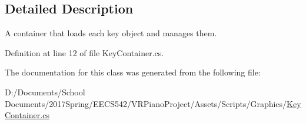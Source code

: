 \subsection{Detailed Description}
A container that loads each key object and manages them. 

Definition at line 12 of file Key\+Container.\+cs.



The documentation for this class was generated from the following file\+:\begin{DoxyCompactItemize}
\item 
D\+:/\+Documents/\+School Documents/2017\+Spring/\+E\+E\+C\+S542/\+V\+R\+Piano\+Project/\+Assets/\+Scripts/\+Graphics/\hyperlink{_key_container_8cs}{Key\+Container.\+cs}\end{DoxyCompactItemize}
